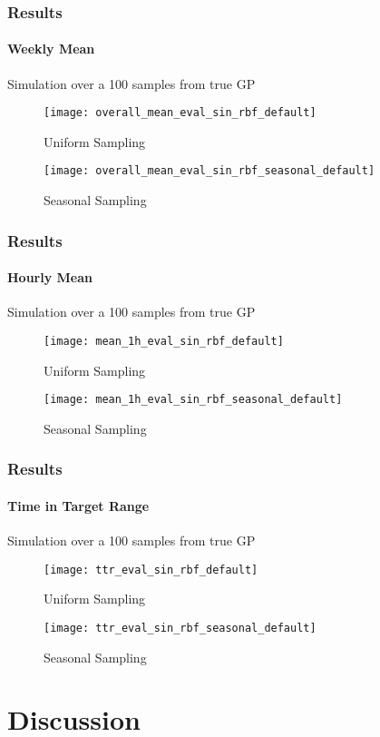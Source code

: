 \documentclass[
	8pt, %
]{beamer}
\begin{document}
\begin{frame}
	\frametitle{Results}
	\framesubtitle{Weekly Mean} %

	Simulation over a 100 samples from true GP

	\begin{figure}
			\texttt{[image: overall\_mean\_eval\_sin\_rbf\_default]}
			\caption{Uniform Sampling}
	\end{figure}

	\begin{figure}
			\texttt{[image: overall\_mean\_eval\_sin\_rbf\_seasonal\_default]}
			\caption{Seasonal Sampling}
	\end{figure}

\end{frame}


\begin{frame}
	\frametitle{Results}
	\framesubtitle{Hourly Mean} %

	Simulation over a 100 samples from true GP

	\begin{figure}
			\texttt{[image: mean\_1h\_eval\_sin\_rbf\_default]}
			\caption{Uniform Sampling}
	\end{figure}

	\begin{figure}
			\texttt{[image: mean\_1h\_eval\_sin\_rbf\_seasonal\_default]}
			\caption{Seasonal Sampling}
	\end{figure}

\end{frame}


\begin{frame}
	\frametitle{Results}
	\framesubtitle{Time in Target Range} %

	Simulation over a 100 samples from true GP

	\begin{figure}
			\texttt{[image: ttr\_eval\_sin\_rbf\_default]}
			\caption{Uniform Sampling}
	\end{figure}

	\begin{figure}
			\texttt{[image: ttr\_eval\_sin\_rbf\_seasonal\_default]}
			\caption{Seasonal Sampling}
	\end{figure}

\end{frame}


\section{Discussion}
\end{document}
